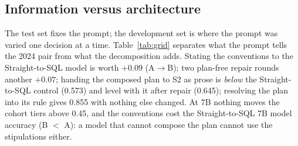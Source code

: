 \subsection{Information versus architecture}
\label{sec:grid}

The test set fixes the prompt; the development set is where the prompt was
varied one decision at a time. Table~\ref{tab:grid} separates what the prompt
tells the 2024 pair from what the decomposition adds. Stating the conventions
to the Straight-to-SQL model is worth $+0.09$ (A$\rightarrow$B); two plan-free
repair rounds another $+0.07$; handing the composed plan to S2 as prose is
\emph{below} the Straight-to-SQL control (0.573) and level with it after repair
(0.645); resolving the plan into its rule gives 0.855 with nothing else
changed. At 7B nothing moves the cohort tiers above 0.45, and the conventions
cost the Straight-to-SQL 7B model accuracy (B $<$ A): a model that cannot compose
the plan cannot use the stipulations either.

